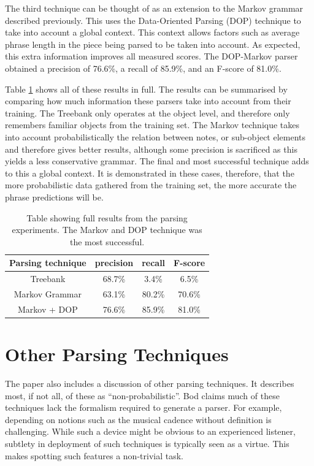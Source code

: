 \documentclass[a4paper,12pt]{article}
\begin{document}
The third technique can be thought of as an extension to the Markov grammar described previously. This uses the Data-Oriented Parsing (DOP) technique to take into account a global context. This context allows factors such as average phrase length in the piece being parsed to be taken into account. As expected, this extra information improves all measured scores. The DOP-Markov parser obtained a precision of 76.6\%, a recall of 85.9\%, and an F-score of 81.0\%. 

Table \ref{resulttab} shows all of these results in full. The results can be summarised by comparing how much information these parsers take into account from their training. The Treebank only operates at the object level, and therefore only remembers familiar objects from the training set. The Markov technique takes into account probabilistically the relation between notes, or sub-object elements and therefore gives better results, although some precision is sacrificed as this yields a less conservative grammar. The final and most successful technique adds to this a global context. It is demonstrated in these cases, therefore, that the more probabilistic data gathered from the training set, the more accurate the phrase predictions will be.

\begin{table}
\centering
\begin{tabular}{ |c|c|c|c| } 
 \hline
 Parsing technique & precision & recall & F-score \\ 
 \hline
 Treebank & 68.7\% & 3.4\% & 6.5\% \\ 
 Markov Grammar & 63.1\% & 80.2\% & 70.6\% \\ 
 Markov + DOP & 76.6\% & 85.9\% & 81.0\% \\ 

 \hline
\end{tabular}
\caption{Table showing full results from the parsing experiments. The Markov and DOP technique was the most successful.}
\label{resulttab}
\end{table}

\section{Other Parsing Techniques}

The paper \cite{Bod_probabilisticgrammars} also includes a discussion of other parsing techniques. It describes most, if not all, of these as ``non-probabilistic''. Bod claims much of these techniques lack the formalism required to generate a parser. For example, depending on notions such as the musical cadence without definition is challenging. While such a device might be obvious to an experienced listener, subtlety in deployment of such techniques is typically seen as a virtue. This makes spotting such features a non-trivial task.
\end{document}
